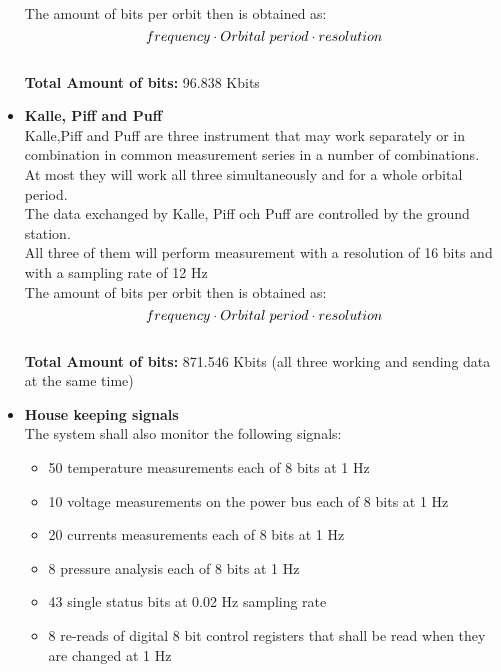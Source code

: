 \documentclass[a4paper,12pt]{article}
\begin{document}
\begin{itemize}
\\
The amount of bits per orbit then is obtained as:
\\
$$frequency \cdot Orbital \hspace{0.1 cm} period \cdot resolution$$
\\
\textbf{Total Amount of bits:} 96.838 Kbits
\\
\item{\textbf{Kalle, Piff and Puff}}
\\
Kalle,Piff and Puff are three instrument that may work separately or in combination in common measurement series in a number of combinations.
\\
At most they will work all three simultaneously and for a whole orbital period.
\\
The data exchanged by Kalle, Piff och Puff are controlled by the ground station.
\\
All three of them will perform measurement with a resolution of 16 bits and with a sampling rate of 12 Hz
\\
The amount of bits per orbit then is obtained as:
\\
$$frequency \cdot Orbital \hspace{0.1 cm} period \cdot resolution$$
\\
\textbf{Total Amount of bits:} 871.546 Kbits (all three working and sending data at the same time)
\\ 
\item{\textbf{House keeping signals}}
\\
The system shall also monitor the following signals:
\begin{itemize}
\item{50 temperature measurements each of 8 bits at 1 Hz}
\item{10 voltage measurements on the power bus each of 8 bits at 1 Hz}
\item{20 currents measurements each of 8 bits at 1 Hz}
\item{8 pressure analysis each of 8 bits at 1 Hz}
\item{43 single status bits at 0.02 Hz sampling rate } 
\item{8 re-reads of digital 8 bit control registers that shall be read when they are changed at 1 Hz}


\end{itemize}
\end{itemize}
\end{document}
